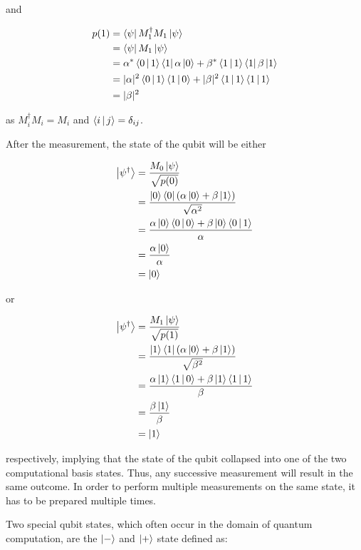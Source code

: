 and

\begin{align}
  p(1) &= \Bra{\psi} M_1^{\dagger} M_1 \Ket{\psi} \\
       &= \Bra{\psi} M_1 \Ket{\psi} \\
       &= \alpha^* \Braket{0|1} \Bra{1} \alpha \Ket{0} + \beta^* \Braket{1|1} \Bra{1} \beta \Ket{1} \\
       &= |\alpha|^2 \Braket{0|1} \Braket{1|0} + |\beta|^2 \Braket{1|1} \Braket{1|1} \\
       &= |\beta|^2
\end{align}

as $M_i^{\dagger}M_i = M_i$ and $\Braket{i|j} = \delta_{ij}$.

After the measurement, the state of the qubit will be either

\begin{align}
  \Ket{\psi^{\dagger}} &= \frac{M_0 \Ket{\psi}}{\sqrt{p(0)}} \\
                       &= \frac{\Ket{0}\Bra{0}\left(\alpha \Ket{0} + \beta \Ket{1}\right)}{\sqrt{\alpha^2}} \\
                       &= \frac{\alpha \Ket{0}\Braket{0 | 0} + \beta \Ket{0} \Braket{ 0 | 1} }{\alpha} \\
                       &= \frac{\alpha \Ket{0}}{\alpha} \\
                       &= \Ket{0}
\end{align}

or

\begin{align}
  \Ket{\psi^{\dagger}} &= \frac{M_1 \Ket{\psi}}{\sqrt{p(1)}} \\
                       &= \frac{\Ket{1}\Bra{1}\left(\alpha \Ket{0} + \beta \Ket{1}\right)}{\sqrt{\beta^2}} \\
                       &= \frac{\alpha \Ket{1}\Braket{1 | 0} + \beta \Ket{1} \Braket{ 1 | 1} }{\beta} \\
                       &= \frac{\beta \Ket{1}}{\beta} \\
                       &= \Ket{1}
\end{align}

respectively, implying that the state of the qubit collapsed into one of the two computational
basis states. Thus, any successive measurement will result in the same outcome.
In order to perform multiple measurements on the same state, it has to be prepared multiple times.

Two special qubit states, which often occur in the domain of quantum computation, are the $\Ket{-}$ and $\Ket{+}$ state defined as:

